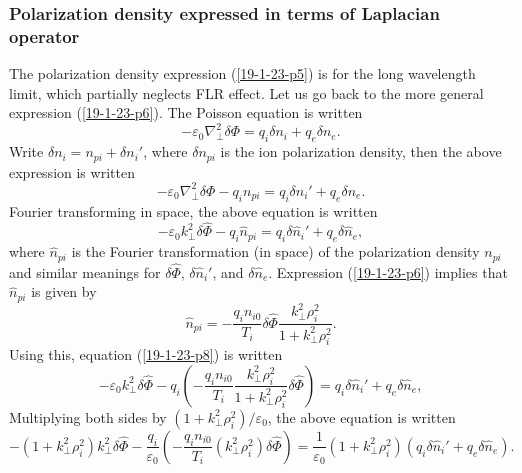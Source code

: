 \documentclass{article}
\begin{document}
\subsubsection{Polarization density expressed in terms of Laplacian operator}

The polarization density expression (\ref{19-1-23-p5}) is for the long
wavelength limit, which partially neglects FLR effect. Let us go back to the
more general expression (\ref{19-1-23-p6}). The Poisson equation is written
\begin{equation}
  - \varepsilon_0 \nabla_{\perp}^2 \delta \Phi = q_i \delta n_i + q_e \delta
  n_e .
\end{equation}
Write $\delta n_i = n_{p i} + \delta n_i'$, where $\delta n_{p i}$ is the ion
polarization density, then the above expression is written
\begin{equation}
  - \varepsilon_0 \nabla_{\perp}^2 \delta \Phi - q_i n_{p i} = q_i \delta n_i'
  + q_e \delta n_e .
\end{equation}
Fourier transforming in space, the above equation is written
\begin{equation}
  \label{19-1-23-p8} - \varepsilon_0 k_{\perp}^2 \delta \hat{\Phi} - q_i
  \hat{n}_{p i} = q_i \delta \hat{n}_i' + q_e \delta \hat{n}_e,
\end{equation}
where $\hat{n}_{p i}$ is the Fourier transformation (in space) of the
polarization density $n_{p i}$ and similar meanings for $\delta \hat{\Phi}$,
$\delta \hat{n}_i'$, and $\delta \hat{n}_e$. Expression (\ref{19-1-23-p6})
implies that $\hat{n}_{p i}$ is given by
\begin{equation}
  \hat{n}_{p i} = - \frac{q_i n_{i 0}}{T_i} \delta \hat{\Phi}
  \frac{k_{\perp}^2 \rho^2_i}{1 + k_{\perp}^2 \rho^2_i} .
\end{equation}
Using this, equation (\ref{19-1-23-p8}) is written
\begin{equation}
  - \varepsilon_0 k_{\perp}^2 \delta \hat{\Phi} - q_i \left( - \frac{q_i n_{i
  0}}{T_i} \frac{k_{\perp}^2 \rho^2_i}{1 + k_{\perp}^2 \rho^2_i} \delta
  \hat{\Phi} \right) = q_i \delta \hat{n}_i' + q_e \delta \hat{n}_e,
\end{equation}
Multiplying both sides by $(1 + k_{\perp}^2 \rho_i^2) / \varepsilon_0$, the
above equation is written
\begin{equation}
  - (1 + k_{\perp}^2 \rho^2_i) k_{\perp}^2 \delta \hat{\Phi} -
  \frac{q_i}{\varepsilon_0} \left( - \frac{q_i n_{i 0}}{T_i} (k_{\perp}^2
  \rho^2_i) \delta \hat{\Phi} \right) = \frac{1}{\varepsilon_0} (1 +
  k_{\perp}^2 \rho^2_i) (q_i \delta \hat{n}_i' + q_e \delta \hat{n}_e) .
\end{equation}
\end{document}
